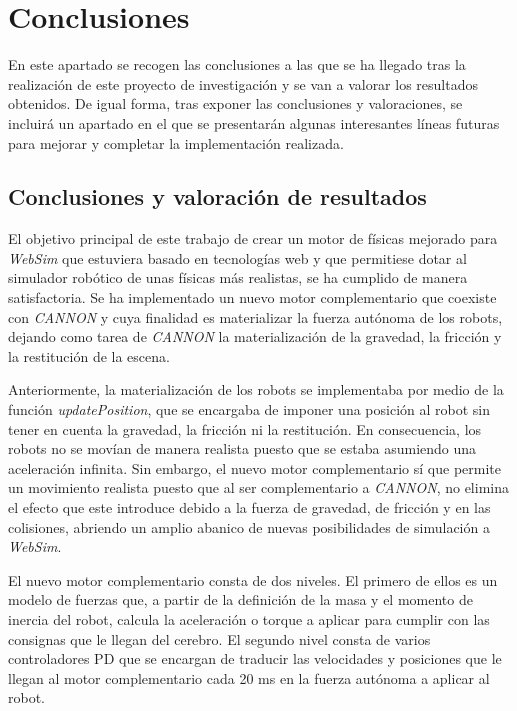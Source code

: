 \chapter{Conclusiones}
\label{chap:conclusiones} 
En este apartado se recogen las conclusiones a las que se ha llegado tras la realización de este proyecto de investigación y se van a valorar los resultados obtenidos. De igual forma, tras exponer las conclusiones y valoraciones, se incluirá un apartado en el que se presentarán algunas interesantes líneas futuras para mejorar y completar la implementación realizada.
   
\section{Conclusiones y valoración de resultados}
El objetivo principal de este trabajo de crear un motor de físicas mejorado para \textit{WebSim} que estuviera basado en tecnologías web y que permitiese dotar al simulador robótico de unas físicas más realistas, se ha cumplido de manera satisfactoria. Se ha implementado un nuevo motor complementario que coexiste con \textit{CANNON} y cuya finalidad es materializar la fuerza autónoma de los robots, dejando como tarea de \textit{CANNON} la materialización de la gravedad, la fricción y la restitución de la escena. \newline

Anteriormente, la materialización de los robots se implementaba por medio de la función \textit{updatePosition}, que se encargaba de imponer una posición al robot sin tener en cuenta la gravedad, la fricción ni la restitución. En consecuencia, los robots no se movían de manera realista puesto que se estaba asumiendo una aceleración infinita. Sin embargo, el nuevo motor complementario sí que permite un movimiento realista puesto que al ser complementario a \textit{CANNON}, no elimina el efecto que este introduce debido a la fuerza de gravedad, de fricción y en las colisiones, abriendo un amplio abanico de nuevas posibilidades de simulación a \textit{WebSim}. \newline 

El nuevo motor complementario consta de dos niveles. El primero de ellos es un modelo de fuerzas que, a partir de la definición de la masa y el momento de inercia del robot, calcula la aceleración o torque a aplicar para cumplir con las consignas que le llegan del cerebro. El segundo nivel consta de varios controladores PD que se encargan de traducir las velocidades y posiciones que le llegan al motor complementario cada 20 ms en la fuerza autónoma a aplicar al robot.

